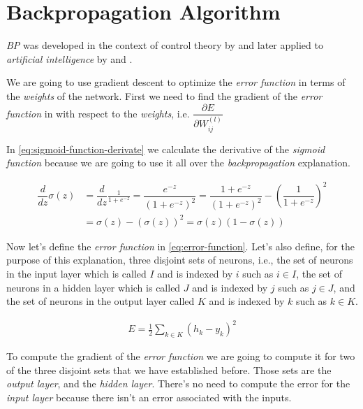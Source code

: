 \section{Backpropagation Algorithm}

\textit{BP} was developed in the context of control theory by
\cite{kelley1960gradient} and later applied to \textit{artificial
intelligence} by \cite{werbos1974beyond} and
\cite{rumelhart1988learning}.

We are going to use gradient descent to optimize the \textit{error
function} in terms of the \textit{weights} of the network. First we
need to find the gradient of the \textit{error function} in with
respect to the \textit{weights}, i.e. $\dfrac{\partial E}{\partial
  W_{ij}^{(l)}}$

In \autoref{eq:sigmoid-function-derivate} we calculate the derivative
of the \textit{sigmoid function} because we are going to use it all
over the \textit{backpropagation} explanation.

\begin{equation}
  \begin{aligned}
    \label{eq:sigmoid-function-derivate}
    \dfrac{d}{dz} \sigma(z) & = \dfrac{d}{dz} \frac{1}{1 + e^{-z}} =
    \dfrac{e^{-z}}{(1 + e^{-z})^2} = \dfrac{1 + e^{-z}}{(1 +
      e^{-z})^2} - \left( \dfrac{1}{1 + e^{-z}} \right)^2 \\
    & = \sigma(z) - (\sigma(z))^2 = \sigma(z)(1-\sigma(z))
  \end{aligned}
\end{equation}

Now let's define the \textit{error function} in
\autoref{eq:error-function}. Let's also define, for the purpose of
this explanation, three disjoint sets of neurons, i.e., the set of
neurons in the input layer which is called $I$ and is indexed by $i$
such as $ i \in I$, the set of neurons in a hidden layer which is
called $J$ and is indexed by $j$ such as $j \in J$, and the set of
neurons in the output layer called $K$ and is indexed by $k$ such as
$k \in K$.

\begin{equation}
  \begin{aligned}
    \label{eq:error-function}
    E = \frac{1}{2} \sum_{k \in K} (h_k - y_k)^2
  \end{aligned}
\end{equation}

To compute the gradient of the \textit{error function} we are going to
compute it for two of the three disjoint sets that we have established
before. Those sets are the \textit{output layer}, and the
\textit{hidden layer}. There's no need to compute the error for the
\textit{input layer} because there isn't an error associated with the
inputs.


